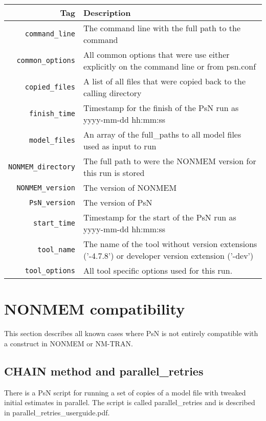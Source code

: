 \begin{center}
    \begin{tabularx}{\linewidth}{ r X }
    \hline
    Tag & Description \\ \hline
    \verb|command_line| & The command line with the full path to the command \\ \hline
    \verb|common_options| & All common options that were use either explicitly on the command line or from psn.conf \\ \hline
    \verb|copied_files| & A list of all files that were copied back to the calling directory \\ \hline
    \verb|finish_time| & Timestamp for the finish of the PsN run as yyyy-mm-dd hh:mm:ss \\ \hline
    \verb|model_files| & An array of the full\_paths to all model files used as input to run \\ \hline
    \verb|NONMEM_directory| & The full path to were the NONMEM version for this run is stored \\ \hline
    \verb|NONMEM_version| & The version of NONMEM \\ \hline
    \verb|PsN_version| & The version of PsN \\ \hline
    \verb|start_time| & Timestamp for the start of the PsN run as yyyy-mm-dd hh:mm:ss \\ \hline
    \verb|tool_name| & The name of the tool without version extensions \mbox{('-4.7.8')} or developer version extension ('-dev') \\ \hline
    \verb|tool_options| & All tool specific options used for this run. \\ \hline
  \end{tabularx}
\end{center}



\section{NONMEM compatibility}

This section describes all known cases where PsN is not entirely compatible with a construct in NONMEM or NM-TRAN.

\subsection{CHAIN method and parallel\_retries}

There is a PsN script for running a set of copies of a model file with tweaked initial estimates in parallel. The script is called parallel\_retries and is described in parallel\_retries\_userguide.pdf.

